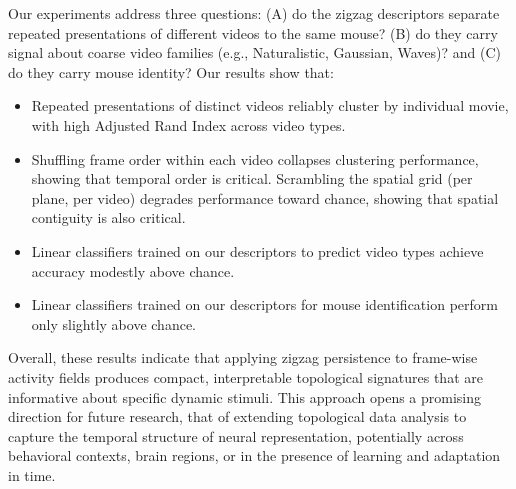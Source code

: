 \documentclass[11pt]{article}
\begin{document}
Our experiments address three questions: (A) do the zigzag descriptors separate repeated presentations of different videos to the same mouse? (B) do they carry signal about coarse video families (e.g., Naturalistic, Gaussian, Waves)? and (C) do they carry mouse identity? Our results show that:

\begin{itemize}
\item[(A1)]Repeated presentations of distinct videos reliably cluster by individual movie, with high Adjusted Rand Index \cite{Hubert1985ComparingP} across video types. 

\item[(A2)] %
Shuffling frame order within each video collapses clustering performance, showing that temporal order is critical. Scrambling the spatial grid (per plane, per video) degrades performance toward chance, showing that spatial contiguity is also critical.

\item[(B)] Linear classifiers trained on our descriptors to predict video types achieve accuracy modestly above chance. 

\item[(C)] Linear classifiers trained on our descriptors for mouse identification perform only slightly above chance.
\end{itemize}

Overall, these results indicate that applying zigzag persistence to frame-wise activity fields produces compact, interpretable topological signatures that are informative about specific dynamic stimuli.
This approach opens a promising direction for future research, that of
extending topological data analysis to capture the temporal structure of neural representation, potentially across behavioral contexts, brain regions, or in the presence of learning and adaptation in time.
\end{document}
